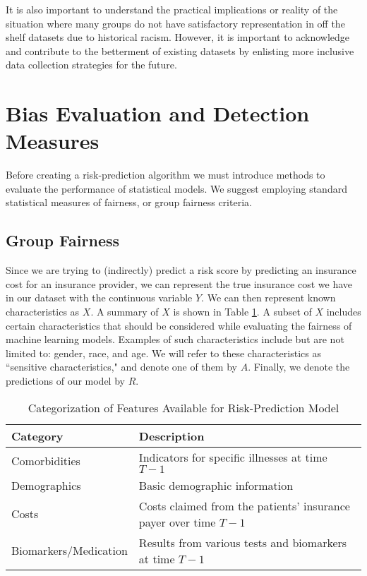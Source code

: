 \documentclass[11pt]{article}
\begin{document}
It is also important to understand the practical implications or reality of the situation where many groups do not have satisfactory representation in off the shelf datasets due to historical racism. However, it is important to acknowledge and contribute to the betterment of existing datasets by enlisting more inclusive data collection strategies for the future.

\section{Bias Evaluation and Detection Measures}

Before creating a risk-prediction algorithm we must introduce methods to evaluate the performance of statistical models. We suggest employing standard statistical measures of fairness, or group fairness criteria.

\subsection{Group Fairness}

Since we are trying to (indirectly) predict a risk score by predicting an insurance cost for an insurance provider, we can represent the true insurance cost we have in our dataset with the continuous variable $Y$. We can then represent known characteristics as $X$. A summary of $X$ is shown in Table \ref{table:1}. A subset of $X$ includes certain characteristics that should be considered while evaluating the fairness of machine learning models. Examples of such characteristics include but are not limited to: gender, race, and age. We will refer to these characteristics as ``sensitive characteristics," and denote one of them by $A$. Finally, we denote the predictions of our model by $R$.

\begin{table}[H]
    \small
    \centering
    \begin{tabular}{ll}
        \toprule
        \textbf{Category}     & \textbf{Description}                                             \\
        \midrule
        Comorbidities         & Indicators for specific illnesses at time $T-1$                  \\
        Demographics          & Basic demographic information                                    \\
        Costs                 & Costs claimed from the patients' insurance payer over time $T-1$ \\
        Biomarkers/Medication & Results from various tests and biomarkers at time $T-1$          \\
        \bottomrule
    \end{tabular}
    \caption{Categorization of Features Available for Risk-Prediction Model}
    \label{table:1}
\end{table}
\end{document}
